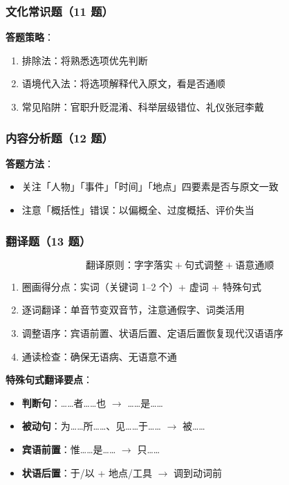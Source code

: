 \subsubsection{文化常识题（11 题）}

\textbf{答题策略}：

\begin{enumerate}
  \item 排除法：将熟悉选项优先判断
  \item 语境代入法：将选项解释代入原文，看是否通顺
  \item 常见陷阱：官职升贬混淆、科举层级错位、礼仪张冠李戴
\end{enumerate}

\subsubsection{内容分析题（12 题）}

\textbf{答题方法}：

\begin{itemize}
  \item 关注「人物」「事件」「时间」「地点」四要素是否与原文一致
  \item 注意「概括性」错误：以偏概全、过度概括、评价失当
\end{itemize}

\subsubsection{翻译题（13 题）}

\[
\textbf{翻译原则}：字字落实 + 句式调整 + 语意通顺
\]

\begin{enumerate}
  \item 圈画得分点：实词（关键词 1--2 个）+ 虚词 + 特殊句式
  \item 逐词翻译：单音节变双音节，注意通假字、词类活用
  \item 调整语序：宾语前置、状语后置、定语后置恢复现代汉语语序
  \item 通读检查：确保无语病、无语意不通
\end{enumerate}

\textbf{特殊句式翻译要点}：

\begin{itemize}
  \item \textbf{判断句}：……者……也 $\to$ ……是……
  \item \textbf{被动句}：为……所……、见……于…… $\to$ 被……
  \item \textbf{宾语前置}：惟……是…… $\to$ 只……
  \item \textbf{状语后置}：于/以 + 地点/工具 $\to$ 调到动词前
\end{itemize}

